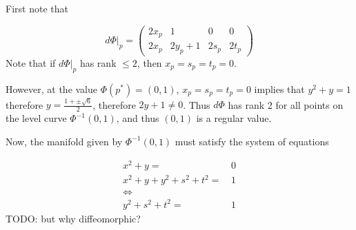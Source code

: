 First note that 

\begin{equation*}
d\Phi|_p = 
\left(
	\begin{matrix}
	2x_p & 1 & 0 & 0
	\\
	2x_p& 2y_p+1 & 2s_p & 2t_p
	\end{matrix}
\right)
\end{equation*}
Note that if $d\Phi|_p$ has rank $\leq 2$, then $x_p = s_p = t_p = 0$.  

However, at the value $\Phi(p^*)=(0,1)$, $x_p = s_p = t_p = 0$ implies that $y^2 + y = 1$ therefore $y=\frac{1 + \pm \sqrt{6}}{2}$, therefore $2y+1 \neq 0$.  Thus $d\Phi$ has rank 2 for all points on the level curve $\Phi^{-1}(0,1)$, and thus $(0,1)$ is a regular value.

Now, the manifold given by $\Phi^{-1}(0,1)$ must satisfy the system of equations 

\begin{align*}

x^2 + y = & \, 0
\\
x^2 + y + y^2 + s^2 + t^2 = & \, 1
\\
\iff
\\
y^2 + s^2 + t^2 = & \, 1
\end{align*}
TODO: but why diffeomorphic?

